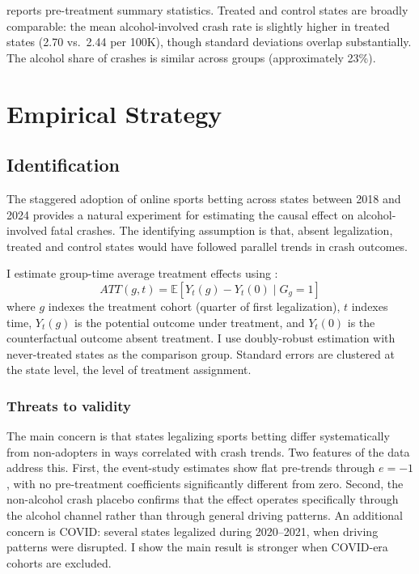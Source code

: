 \documentclass[12pt]{article}
\newcommand{\E}{\mathbb{E}}
\begin{document}


 reports pre-treatment summary statistics. Treated and control states are broadly comparable: the mean alcohol-involved crash rate is slightly higher in treated states (2.70 vs.\ 2.44 per 100K), though standard deviations overlap substantially. The alcohol share of crashes is similar across groups (approximately 23\%).

\section{Empirical Strategy}

\subsection{Identification}

The staggered adoption of online sports betting across states between 2018 and 2024 provides a natural experiment for estimating the causal effect on alcohol-involved fatal crashes. The identifying assumption is that, absent legalization, treated and control states would have followed parallel trends in crash outcomes.

I estimate group-time average treatment effects using \citet{CallawayAndSantAnna2021}:
\begin{equation}
ATT(g,t) = \E[Y_t(g) - Y_t(0) \mid G_g = 1]
\end{equation}
where $g$ indexes the treatment cohort (quarter of first legalization), $t$ indexes time, $Y_t(g)$ is the potential outcome under treatment, and $Y_t(0)$ is the counterfactual outcome absent treatment. I use doubly-robust estimation with never-treated states as the comparison group. Standard errors are clustered at the state level, the level of treatment assignment.

\subsubsection*{Threats to validity} The main concern is that states legalizing sports betting differ systematically from non-adopters in ways correlated with crash trends. Two features of the data address this. First, the event-study estimates show flat pre-trends through $e = -1$, with no pre-treatment coefficients significantly different from zero. Second, the non-alcohol crash placebo confirms that the effect operates specifically through the alcohol channel rather than through general driving patterns. An additional concern is COVID: several states legalized during 2020--2021, when driving patterns were disrupted. I show the main result is stronger when COVID-era cohorts are excluded.
\end{document}
